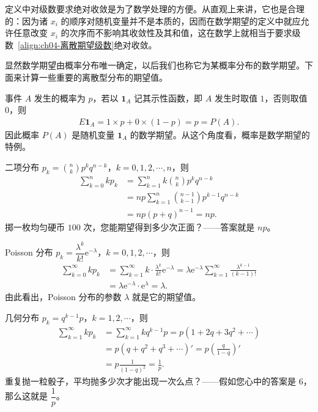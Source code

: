 \documentclass[../../main.tex]{subfiles}
\begin{document}
定义中对级数要求绝对收敛是为了数学处理的方便。从直观上来讲，它也是合理的：因为诸 $x_i$ 的顺序对随机变量并不是本质的，因而在数学期望的定义中就应允许任意改变 $x_i$ 的次序而不影响其收敛性及其和值，这在数学上就相当于要求级数~\eqref{align:ch04-离散期望级数}绝对收敛。

显然数学期望由概率分布唯一确定，以后我们也称它为某概率分布的数学期望。下面来计算一些重要的离散型分布的期望值。

\begin{example}[Bernoulli 分布]\label{example:ch04-期望-Bernoulli}
事件 $A$ 发生的概率为 $p$，若以 $\mathbf{1}_A$ 记其示性函数，即 $A$ 发生时取值 $1$，否则取值 $0$，则
\begin{align}
E\mathbf{1}_A=1\times p+0\times(1-p)=p=P(A).\label{align:ch04-示性函数期望}
\end{align}
因此概率 $P(A)$ 是随机变量 $\mathbf{1}_A$ 的数学期望。从这个角度看，概率是数学期望的特例。
\end{example}

\begin{example}[二项分布的期望]\label{example:ch04-期望-二项}
二项分布 $p_k=\binom{n}{k}p^k q^{n-k}$，$k=0,1,2,\cdots,n$，则
\begin{align*}
\sum_{k=0}^n kp_k
&=\sum_{k=1}^n k\binom{n}{k}p^k q^{n-k}\\
&=np\sum_{k=1}^n \binom{n-1}{k-1}p^{k-1}q^{n-k}\\
&=np(p+q)^{n-1}=np.
\end{align*}
掷一枚均匀硬币 $100$ 次，您能期望得到多少次正面？——答案就是 $np$。
\end{example}

\begin{example}\label{example:ch04-期望-Poisson}
Poisson 分布 $p_k=\dfrac{\lambda^k}{k!}\mathrm{e}^{-\lambda}$，$k=0,1,2,\cdots$，则
\begin{align}
\sum_{k=0}^{\infty} kp_k
&=\sum_{k=1}^{\infty} k\cdot\frac{\lambda^k}{k!}\mathrm{e}^{-\lambda}
=\lambda\mathrm{e}^{-\lambda}\sum_{k=1}^{\infty}\frac{\lambda^{k-1}}{(k-1)!}\nonumber\\
&=\lambda\mathrm{e}^{-\lambda}\cdot\mathrm{e}^{\lambda}=\lambda.\label{align:ch04-Poisson期望}
\end{align}
由此看出，Poisson 分布的参数 $\lambda$ 就是它的期望值。
\end{example}

\begin{example}[几何分布的期望]\label{example:ch04-期望-几何}
几何分布 $p_k=q^{k-1}p$，$k=1,2,\cdots$，则
\begin{align}
\sum_{k=1}^{\infty} kp_k
&=\sum_{k=1}^{\infty} kq^{k-1}p=p(1+2q+3q^2+\cdots)\nonumber\\
&=p(q+q^2+q^3+\cdots)'=p\left(\frac{q}{1-q}\right)'\nonumber\\
&=p\frac{1}{(1-q)^2}=\frac{1}{p}.\label{align:ch04-几何期望}
\end{align}
重复抛一粒骰子，平均抛多少次才能出现一次么点？——假如您心中的答案是 $6$，那么这就是 $\dfrac{1}{p}$。
\end{example}
\end{document}
